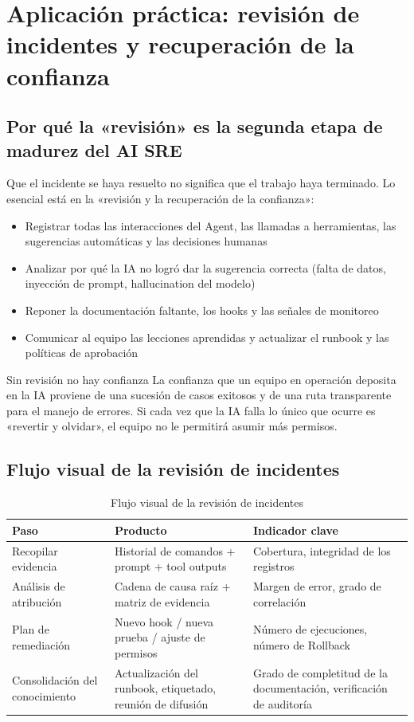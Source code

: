 \section{Aplicación práctica: revisión de incidentes y recuperación de la confianza}

\subsection{Por qué la «revisión» es la segunda etapa de madurez del AI SRE}

Que el incidente se haya resuelto no significa que el trabajo haya terminado. Lo esencial está en la «revisión y la recuperación de la confianza»:

\begin{itemize}
    \item Registrar todas las interacciones del Agent, las llamadas a herramientas, las sugerencias automáticas y las decisiones humanas
    \item Analizar por qué la IA no logró dar la sugerencia correcta (falta de datos, inyección de prompt, hallucination del modelo)
    \item Reponer la documentación faltante, los hooks y las señales de monitoreo
    \item Comunicar al equipo las lecciones aprendidas y actualizar el runbook y las políticas de aprobación
\end{itemize}

\begin{warningbox}{Sin revisión no hay confianza}
La confianza que un equipo en operación deposita en la IA proviene de una sucesión de casos exitosos y de una ruta transparente para el manejo de errores. Si cada vez que la IA falla lo único que ocurre es «revertir y olvidar», el equipo no le permitirá asumir más permisos.
\end{warningbox}

\subsection{Flujo visual de la revisión de incidentes}

\begin{table}[H]
\centering
\begin{tabular}{p{} p{} p{}}
\toprule
Paso & Producto & Indicador clave \\
\midrule
Recopilar evidencia & Historial de comandos + prompt + tool outputs & Cobertura, integridad de los registros \\
Análisis de atribución & Cadena de causa raíz + matriz de evidencia & Margen de error, grado de correlación \\
Plan de remediación & Nuevo hook / nueva prueba / ajuste de permisos & Número de ejecuciones, número de Rollback \\
Consolidación del conocimiento & Actualización del runbook, etiquetado, reunión de difusión & Grado de completitud de la documentación, verificación de auditoría \\
\bottomrule
\end{tabular}
\caption{Flujo visual de la revisión de incidentes}
\end{table}

